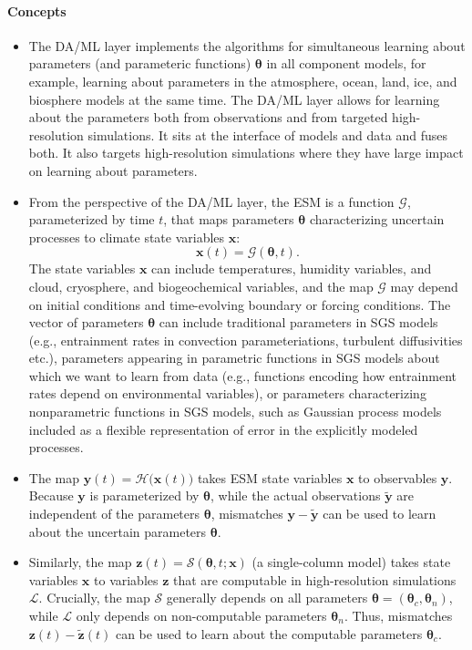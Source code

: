 \documentclass{article}
\renewcommand{\vec}[1]{\boldsymbol{{#1}}}
\begin{document}
\paragraph{Concepts}
\begin{itemize}
    \item The DA/ML layer implements the algorithms for simultaneous learning about parameters (and parameteric functions) $\vec{\theta}$ in all component models, for example, learning about parameters in the atmosphere, ocean, land, ice, and biosphere models at the same time. The DA/ML layer allows for learning about the parameters both from observations and from targeted high-resolution simulations. It sits at the interface of models and data and fuses both. It also targets high-resolution simulations where they have large impact on learning about parameters. 
    \item From the perspective of the DA/ML layer, the ESM is a function $\mathcal{G}$, parameterized by time $t$, that maps parameters $\vec{\theta}$ characterizing uncertain processes to climate state variables $\vec{x}$:
    \begin{equation}
    \vec{x}(t) = \mathcal{G}(\vec{\theta}, t).
    \end{equation}
    The state variables $\vec{x}$ can include temperatures, humidity variables, and cloud, cryosphere, and biogeochemical variables, and the map $\mathcal{G}$ may depend on initial conditions and time-evolving boundary or forcing conditions. The vector of parameters $\vec{\theta}$ can include traditional parameters in SGS models (e.g., entrainment rates in convection parameteriations, turbulent diffusivities etc.), parameters appearing in parametric functions in SGS models about which we want to learn from data (e.g., functions encoding how entrainment rates depend on environmental variables), or parameters characterizing nonparametric functions in SGS models, such as Gaussian process models \citep{Rasmussen06a} included as a flexible representation of error in the explicitly modeled processes.  
    \item The map $\vec{y}(t)=\mathcal{H}\bigl(\vec{x}(t)\bigr)$ takes ESM state variables $\vec{x}$ to observables $\vec{y}$. Because $\vec{y}$ is parameterized by $\vec{\theta}$, while the actual observations $\vec{\tilde y}$ are independent of the parameters $\vec{\theta}$, mismatches $\vec{y} - \vec{\tilde y}$ can be used to learn about the uncertain parameters $\vec{\theta}$. 
    \item Similarly, the map $\vec{z}(t) = \mathcal{S}(\vec{\theta},t; \vec{x})$ (a single-column model) takes state variables $\vec{x}$ to variables $\vec{z}$ that are computable in high-resolution simulations $\mathcal{L}$. Crucially, the map $\mathcal{S}$ generally depends on all parameters $\vec{\theta}=(\vec{\theta}_c, \vec{\theta}_n)$, while $\mathcal{L}$ only depends on non-computable parameters $\vec{\theta}_n$. Thus, mismatches $\vec{z}(t) - \vec{\tilde z}(t)$ can be used to learn about the computable parameters $\vec{\theta}_c$.

\end{itemize}
\end{document}
